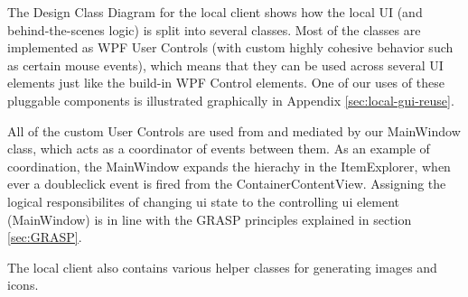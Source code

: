 The Design Class Diagram for the local client shows how the local UI (and behind-the-scenes logic) is split into several classes. Most of the classes are implemented as WPF User Controls (with custom highly cohesive behavior such as certain mouse events), which means that they can be used across several UI elements just like the build-in WPF Control elements. One of our uses of these pluggable components is illustrated graphically in Appendix  \ref{sec:local-gui-reuse}.

All of the custom User Controls are used from and mediated by our MainWindow class, which acts as a coordinator of events between them. As an example of coordination, the MainWindow expands the hierachy in the ItemExplorer, when ever a doubleclick event is fired from the ContainerContentView. Assigning the logical responsibilites of changing ui state to the controlling ui element (MainWindow) is in line with the GRASP principles explained in section \ref{sec:GRASP}.

The local client also contains various helper classes for generating images and icons.